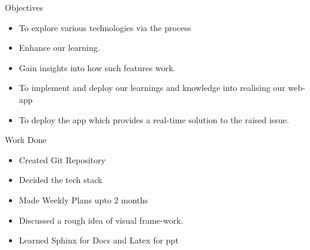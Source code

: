 \documentclass{beamer}
\begin{document}
	\begin{frame}{Objectives}
		\begin{itemize}
		\item To explore various technologies via the process 
		\item Enhance our learning.
		\item Gain insights into how such features work. 
		\item To implement and deploy our learnings and knowledge into realising our web-app
		\item To deploy the app which provides a real-time solution to the raised issue.
		\end{itemize}
	\end{frame}

	\begin{frame}{Work Done}
		\justifying
		\begin{itemize}
		\item  Created Git Repository
		\item  Decided the tech stack
		\item  Made Weekly Plans upto 2 months
		\item  Discussed a rough idea of visual frame-work.
		\item  Learned Sphinx for Docs and Latex for ppt
		\end{itemize}
	\end{frame}
\end{document}
